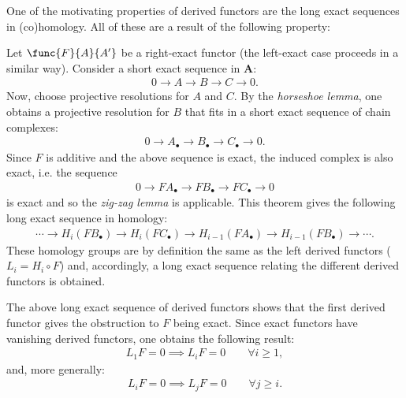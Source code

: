 	One of the motivating properties of derived functors are the long exact sequences in (co)homology. All of these are a result of the following property:
	\begin{property}
		Let $\func{F}{A}{A'}$ be a right-exact functor (the left-exact case proceeds in a similar way). Consider a short exact sequence in $\mathbf{A}$:
		\begin{gather}
			0\longrightarrow A\longrightarrow B\longrightarrow C\longrightarrow 0.
		\end{gather}
		Now, choose projective resolutions for $A$ and $C$. By the \textit{horseshoe lemma}, one obtains a projective resolution for $B$ that fits in a short exact sequence of chain complexes:
		\begin{gather}
			0\longrightarrow A_\bullet\longrightarrow B_\bullet\longrightarrow C_\bullet\longrightarrow 0.
		\end{gather}
		Since $F$ is additive and the above sequence is exact, the induced complex is also exact, i.e. the sequence
		\begin{gather}
			0\longrightarrow FA_\bullet\longrightarrow FB_\bullet\longrightarrow FC_\bullet\longrightarrow0
		\end{gather}
		is exact and so the \textit{zig-zag lemma} is applicable. This theorem gives the following long exact sequence in homology:
		\begin{gather}
			\cdots\longrightarrow H_i(FB_\bullet)\longrightarrow H_i(FC_\bullet) \longrightarrow H_{i-1}(FA_\bullet) \longrightarrow H_{i-1}(FB_\bullet) \longrightarrow\cdots.
		\end{gather}
		These homology groups are by definition the same as the left derived functors ($L_i = H_i\circ F$) and, accordingly, a long exact sequence relating the different derived functors is obtained.
	\end{property}
	\begin{result}
		The above long exact sequence of derived functors shows that the first derived functor gives the obstruction to $F$ being exact. Since exact functors have vanishing derived functors, one obtains the following result:
		\begin{gather}
			L_1F = 0\implies L_iF=0\qquad\forall i\geq 1,
		\end{gather}
        and, more generally:
        \begin{gather}
            L_iF = 0\implies L_jF=0\qquad\forall j\geq i.
        \end{gather}
	\end{result}

